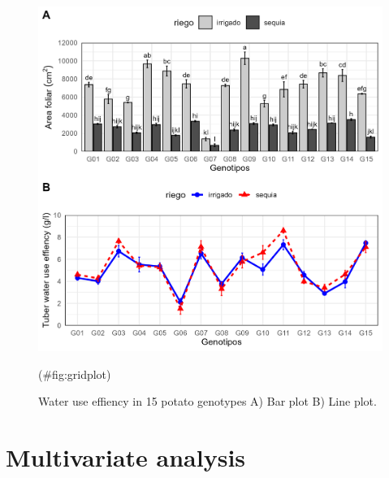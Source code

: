 \begin{figure}

{\centering \includegraphics[width=0.98\linewidth]{files/fig-02} 

}

\caption{Water use effiency in 15 potato genotypes A) Bar plot B) Line plot.}(\#fig:gridplot)
\end{figure}

\section{Multivariate analysis}\label{multivariate-analysis}

